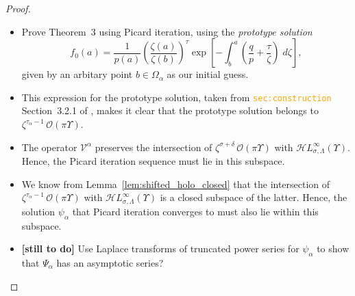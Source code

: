 \documentclass{article}
\newcommand{\singexp}[2]{\mathcal{H}L^\infty_{#1, #2}}
\newcommand{\volterra}{\mathcal{V}}
\newcommand{\softpart}{\mathcal{V}_\star}
\newcommand{\solproto}{f_0}
\theoremstyle{definition}
\theoremstyle{plain}
\begin{document}
\begin{proof}
\color{SlateBlue}
\begin{itemize}
\item Prove Theorem~3 using Picard iteration, using the {\em prototype solution}
\[ \solproto(a) = \frac{1}{p(a)} \left(\frac{\zeta(a)}{\zeta(b)}\right)^\tau \exp\left[-\int_b^a \left( \frac{q}{p} + \frac{\tau}{\zeta} \right)\;d\zeta\right], \]
given by an arbitary point $b \in \Omega_\alpha$ as our initial guess.
\item This expression for the prototype solution, taken from \textcolor{orange}{\tt sec:construction} Section~3.2.1 of \cite{reg-sing-volterra}, makes it clear that the prototype solution belongs to $\zeta^{\tau_\alpha - 1}\,\mathcal{O}(\pi \Upsilon)$.
\item The operator $\volterra^\alpha$ preserves the intersection of $\zeta^{\sigma + \delta}\,\mathcal{O}(\pi \Upsilon)$ with $\singexp{\sigma}{\Lambda}(\Upsilon)$. Hence, the Picard iteration sequence must lie in this subspace.
\item We know from Lemma~\ref{lem:shifted_holo_closed} that the intersection of $\zeta^{\tau_\alpha - 1}\,\mathcal{O}(\pi \Upsilon)$ with $\singexp{\sigma}{\Lambda}(\Upsilon)$ is a closed subspace of the latter. Hence, the solution $\psi_\alpha$ that Picard iteration converges to must also lie within this subspace.
\color{SteelBlue}
\item \textbf{[still to do]} Use Laplace transforms of truncated power series for $\psi_\alpha$ to show that $\Psi_\alpha$ has an asymptotic series?
\end{itemize}
\color{BlueViolet}



\end{proof}
\end{document}
